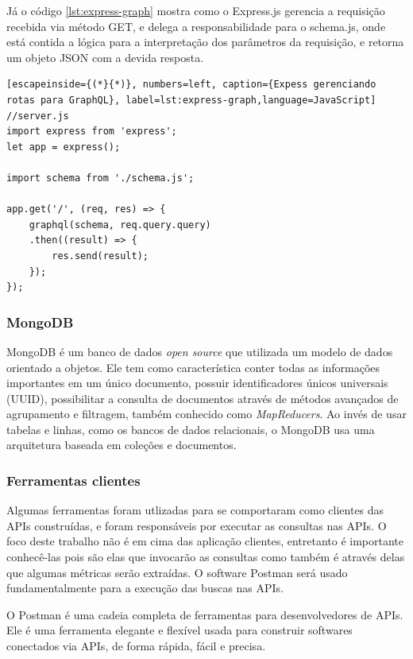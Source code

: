 Já o código \ref{lst:express-graph} mostra como o Express.js gerencia a requisição recebida via método GET, e delega a responsabilidade para o \textup{schema.js}, onde está contida a lógica para a interpretação dos parâmetros da requisição, e retorna um objeto JSON com a devida resposta.

\begin{lstlisting}[escapeinside={(*}{*)}, numbers=left, caption={Expess gerenciando rotas para GraphQL}, label=lst:express-graph,language=JavaScript]
//server.js
import express from 'express';
let app = express();

import schema from './schema.js';

app.get('/', (req, res) => {
    graphql(schema, req.query.query)
    .then((result) => {
        res.send(result);
    });
});

\end{lstlisting}

\subsubsection*{MongoDB}

MongoDB é um banco de dados \textit{open source} que utilizada um modelo de dados orientado a objetos. Ele tem como característica conter todas as informações importantes em um único documento, possuir identificadores únicos universais (UUID), possibilitar a consulta de documentos através de métodos avançados de agrupamento e filtragem, também conhecido como \textit{MapReducers}. Ao invés de usar tabelas e linhas, como os bancos de dados relacionais, o MongoDB usa uma arquitetura baseada em coleções e documentos.


\subsubsection*{Ferramentas clientes}

Algumas ferramentas foram utlizadas para se comportaram como clientes das APIs construídas, e foram responsáveis por executar as consultas nas APIs. O foco deste trabalho não é em cima das aplicação clientes, entretanto é importante conhecê-las pois são elas que invocarão as consultas como também é através delas que algumas métricas serão extraídas. O software Postman será usado fundamentalmente para a execução das buscas nas APIs.

O Postman é uma cadeia completa de ferramentas para desenvolvedores de APIs. Ele é uma ferramenta elegante e flexível usada para construir softwares conectados via APIs, de forma rápida, fácil e precisa.

